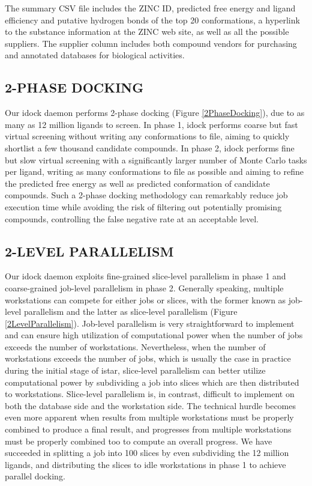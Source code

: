 \documentclass[12pt]{article}
\begin{document}
The summary CSV file includes the ZINC ID, predicted free energy and ligand efficiency and putative hydrogen bonds of the top 20 conformations, a hyperlink to the substance information at the ZINC web site, as well as all the possible suppliers. The supplier column includes both compound vendors for purchasing and annotated databases for biological activities.

\subsection*{\sffamily \large 2-PHASE DOCKING}

Our idock daemon performs 2-phase docking (Figure \ref{2PhaseDocking}), due to as many as 12 million ligands to screen. In phase 1, idock performs coarse but fast virtual screening without writing any conformations to file, aiming to quickly shortlist a few thousand candidate compounds. In phase 2, idock performs fine but slow virtual screening with a significantly larger number of Monte Carlo tasks per ligand, writing as many conformations to file as possible and aiming to refine the predicted free energy as well as predicted conformation of candidate compounds. Such a 2-phase docking methodology can remarkably reduce job execution time while avoiding the risk of filtering out potentially promising compounds, controlling the false negative rate at an acceptable level.

\subsection*{\sffamily \large 2-LEVEL PARALLELISM}

Our idock daemon exploits fine-grained slice-level parallelism in phase 1 and coarse-grained job-level parallelism in phase 2. Generally speaking, multiple workstations can compete for either jobs or slices, with the former known as job-level parallelism and the latter as slice-level parallelism (Figure \ref{2LevelParallelism}). Job-level parallelism is very straightforward to implement and can ensure high utilization of computational power when the number of jobs exceeds the number of workstations. Nevertheless, when the number of workstations exceeds the number of jobs, which is usually the case in practice during the initial stage of istar, slice-level parallelism can better utilize computational power by subdividing a job into slices which are then distributed to workstations. Slice-level parallelism is, in contrast, difficult to implement on both the database side and the workstation side. The technical hurdle becomes even more apparent when results from multiple workstations must be properly combined to produce a final result, and progresses from multiple workstations must be properly combined too to compute an overall progress. We have succeeded in splitting a job into 100 slices by even subdividing the 12 million ligands, and distributing the slices to idle workstations in phase 1 to achieve parallel docking.
\end{document}
